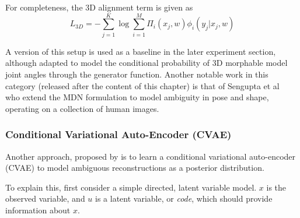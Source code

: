 For completeness, the 3D alignment term is given as
\begin{equation}
  L_{3D} = -\sum_{j=1}^{K} \log \sum_{i=1}^{M} \Pi_{i}(x_{j}, w) \phi_{i}(y_j | x_j, w)
\end{equation}

A version of this setup is used as a baseline in the later experiment section, although adapted to model the conditional probability of 3D morphable model joint angles through the generator function. Another notable work in this category (released after the content of this chapter) is that of Sengupta et al~ who extend the MDN formulation to model ambiguity in pose and shape, operating on a collection of human images. 

\subsubsection{Conditional Variational Auto-Encoder (CVAE)}

Another approach, proposed by \citet{sharma19monocular} is to learn a conditional variational auto-encoder (CVAE) to model ambiguous reconstructions as a posterior distribution. 

To explain this, first consider a simple directed, latent variable model. $x$ is the observed variable, and $u$ is a latent variable, or \emph{code}, which should provide information about $x$.


\begin{center}
  \end{center}


